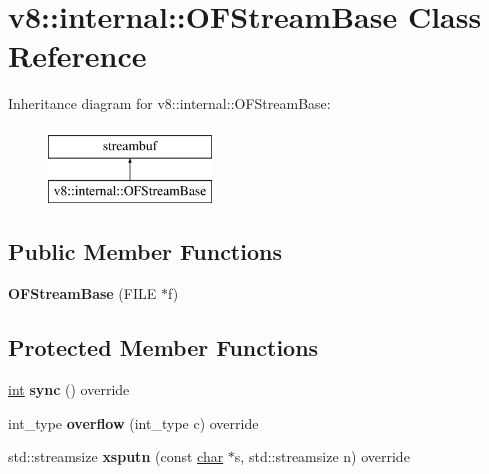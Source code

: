 \hypertarget{classv8_1_1internal_1_1OFStreamBase}{}\section{v8\+:\+:internal\+:\+:O\+F\+Stream\+Base Class Reference}
\label{classv8_1_1internal_1_1OFStreamBase}
Inheritance diagram for v8\+:\+:internal\+:\+:O\+F\+Stream\+Base\+:\begin{figure}[H]
\begin{center}
\leavevmode
\includegraphics[height=2.000000cm]{classv8_1_1internal_1_1OFStreamBase}
\end{center}
\end{figure}
\subsection*{Public Member Functions}
\begin{DoxyCompactItemize}
\item 
\mbox{\label{classv8_1_1internal_1_1OFStreamBase_ac9d18e4ff834a53ad5e8ce5c43784f68}} 
{\bfseries O\+F\+Stream\+Base} (F\+I\+LE $\ast$f)
\end{DoxyCompactItemize}
\subsection*{Protected Member Functions}
\begin{DoxyCompactItemize}
\item 
\mbox{\label{classv8_1_1internal_1_1OFStreamBase_a506b1d75383dfd930cf734668f7b9508}} 
\mbox{\hyperlink{classint}{int}} {\bfseries sync} () override
\item 
\mbox{\label{classv8_1_1internal_1_1OFStreamBase_ab30b1acb2838a9013f365b0ac9dde264}} 
int\+\_\+type {\bfseries overflow} (int\+\_\+type c) override
\item 
\mbox{\label{classv8_1_1internal_1_1OFStreamBase_af89375a8ee4f6ea371a70dff0c666a6b}} 
std\+::streamsize {\bfseries xsputn} (const \mbox{\hyperlink{classchar}{char}} $\ast$s, std\+::streamsize n) override
\end{DoxyCompactItemize}
